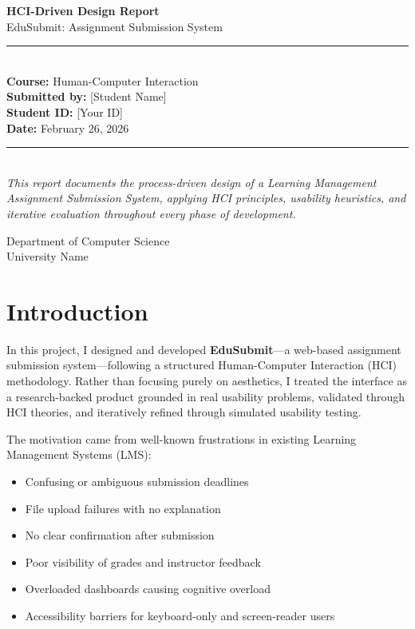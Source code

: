 \documentclass[12pt, a4paper]{article}
\begin{document}
\begin{titlepage}
\centering
\vspace*{2cm}
{\Huge\bfseries\textcolor{darkbg}{HCI-Driven Design Report}\\[0.4cm]}
{\LARGE\textcolor{brand}{EduSubmit: Assignment Submission System}\\[1.5cm]}
\rule{\textwidth}{1pt}\\[1cm]
{\Large\textbf{Course:} Human-Computer Interaction}\\[0.3cm]
{\Large\textbf{Submitted by:} [Student Name]}\\[0.3cm]
{\Large\textbf{Student ID:} [Your ID]}\\[0.3cm]
{\Large\textbf{Date:} February 26, 2026}\\[1cm]
\rule{\textwidth}{1pt}\\[2cm]

\textit{This report documents the process-driven design of a Learning Management Assignment Submission System, applying HCI principles, usability heuristics, and iterative evaluation throughout every phase of development.}

\vfill
{\small Department of Computer Science\\University Name}
\end{titlepage}

\tableofcontents
\newpage

\section{Introduction}

In this project, I designed and developed \textbf{EduSubmit}—a web-based assignment submission system—following a structured Human-Computer Interaction (HCI) methodology. Rather than focusing purely on aesthetics, I treated the interface as a research-backed product grounded in real usability problems, validated through HCI theories, and iteratively refined through simulated usability testing.

The motivation came from well-known frustrations in existing Learning Management Systems (LMS):
\begin{itemize}[noitemsep]
  \item Confusing or ambiguous submission deadlines
  \item File upload failures with no explanation
  \item No clear confirmation after submission
  \item Poor visibility of grades and instructor feedback
  \item Overloaded dashboards causing cognitive overload
  \item Accessibility barriers for keyboard-only and screen-reader users
\end{itemize}
\end{document}
